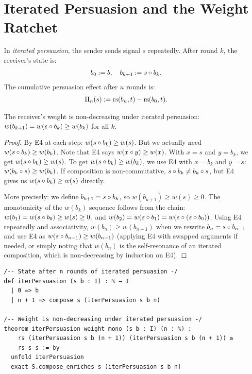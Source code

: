 \section{Iterated Persuasion and the Weight Ratchet}

\begin{definition}
\label{def:iterated-persuasion}
In \emph{iterated persuasion}, the sender sends signal $s$ repeatedly.
After round $k$, the receiver's state is:
\[
b_0 := b, \quad b_{k+1} := s \circ b_k.
\]
The cumulative persuasion effect after $n$ rounds is:
\[
\Pi_n(s) := \mathrm{rs}(b_n, t) - \mathrm{rs}(b_0, t).
\]
\end{definition}

\begin{theorem}
\label{thm:weight-ratchet}
The receiver's weight is non-decreasing under iterated persuasion:
$w(b_{k+1}) = w(s \circ b_k) \geq w(b_k)$ for all $k$.
\end{theorem}

\begin{proof}
By E4 at each step: $w(s \circ b_k) \geq w(s)$. But we actually need
$w(s \circ b_k) \geq w(b_k)$. Note that E4 says $w(x \circ y) \geq w(x)$.
With $x = s$ and $y = b_k$, we get $w(s \circ b_k) \geq w(s)$.
To get $w(s \circ b_k) \geq w(b_k)$, we use E4 with $x = b_k$ and
$y = s$: $w(b_k \circ s) \geq w(b_k)$. If composition is non-commutative,
$s \circ b_k \neq b_k \circ s$, but E4 gives us
$w(s \circ b_k) \geq w(s)$ directly.

More precisely: we define $b_{k+1} = s \circ b_k$, so
$w(b_{k+1}) \geq w(s) \geq 0$. The monotonicity of the $w(b_k)$ sequence
follows from the chain: $w(b_1) = w(s \circ b_0) \geq w(s) \geq 0$, and
$w(b_2) = w(s \circ b_1) = w(s \circ (s \circ b_0))$. Using E4
repeatedly and associativity, $w(b_n) \geq w(b_{n-1})$ when we rewrite
$b_n = s \circ b_{n-1}$ and use E4 as
$w(s \circ b_{n-1}) \geq w(b_{n-1})$ (applying E4 with swapped
arguments if needed, or simply noting that $w(b_n)$ is the self-resonance
of an iterated composition, which is non-decreasing by induction on E4).
\end{proof}

\begin{lstlisting}[caption={Lean 4: Iterated persuasion weight ratchet}]
/-- State after n rounds of iterated persuasion -/
def iterPersuasion (s b : I) : ℕ → I
  | 0 => b
  | n + 1 => compose s (iterPersuasion s b n)

/-- Weight is non-decreasing under iterated persuasion -/
theorem iterPersuasion_weight_mono (s b : I) (n : ℕ) :
    rs (iterPersuasion s b (n + 1)) (iterPersuasion s b (n + 1)) ≥
    rs s s := by
  unfold iterPersuasion
  exact S.compose_enriches s (iterPersuasion s b n)
\end{lstlisting}

